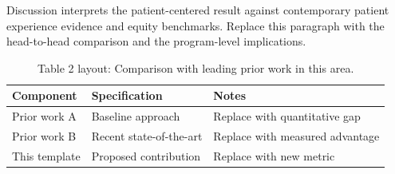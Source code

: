 
Discussion interprets the patient-centered result against contemporary patient experience evidence and equity benchmarks. Replace this paragraph with the head-to-head comparison and the program-level implications.

\begin{table}[H]
\caption{Table 2 layout: Comparison with leading prior work in this area.}
\label{tab:discussion_compare}
\centering
\begin{tabular}{>{\raggedright\arraybackslash}p{3.4cm} >{\raggedright\arraybackslash}p{4.6cm} >{\raggedright\arraybackslash}p{5.4cm}}
\toprule
\textbf{Component} & \textbf{Specification} & \textbf{Notes} \\
\midrule
  Prior work A & Baseline approach & Replace with quantitative gap \\
  Prior work B & Recent state-of-the-art & Replace with measured advantage \\
  This template & Proposed contribution & Replace with new metric \\
\bottomrule
\end{tabular}
\end{table}

